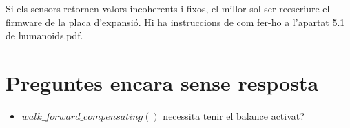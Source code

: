 \documentclass{article}
\begin{document}
Si els sensors retornen valors incoherents i fixos, el millor sol ser reescriure el firmware de la placa d'expansió. Hi ha instruccions de com fer-ho a l'apartat 5.1 de humanoids.pdf.

\section{Preguntes encara sense resposta}
\begin{itemize}
	\item $walk\_forward\_compensating()$ necessita tenir el balance activat?
\end{itemize}
\end{document}
